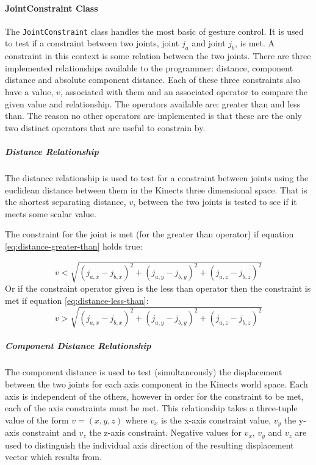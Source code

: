 \documentclass[a4paper,oneside]{memoir}
\begin{document}
				\paragraph{JointConstraint Class}

					The \texttt{JointConstraint} class handles the most basic of gesture control.
					It is used to test if a constraint between two joints, joint $j_a$ and joint $j_b$, is met.
					A constraint in this context is some relation between the two joints.
					There are three implemented relationships available to the programmer: distance, component distance and absolute component distance.
					Each of these three constraints also have a value, $v$, associated with them and an associated operator to compare the given value and relationship.
					The operators available are: greater than and less than.
					The reason no other operators are implemented is that these are the only two distinct operators that are useful to constrain by.

					\subparagraph{Distance Relationship}

						The distance relationship is used to test for a constraint between joints using the euclidean distance between them in the Kinects three dimensional space.
						That is the shortest separating distance, $v$, between the two joints is tested to see if it meets some scalar value.

						The constraint for the joint is met (for the greater than operator) if equation \ref{eq:distance-greater-than} holds true:

						\begin{equation}
							v < \sqrt{(j_{a,x} - j_{b,x})^2 + (j_{a,y} - j_{b,y})^2 + (j_{a,z} - j_{b,z})^2}
							\label{eq:distance-greater-than}
						\end{equation}
						Or if the constraint operator given is the less than operator then the constraint is met if equation \ref{eq:distance-less-than}:
						\begin{equation}
							v > \sqrt{(j_{a,x} - j_{b,x})^2 + (j_{a,y} - j_{b,y})^2 + (j_{a,z} - j_{b,z})^2}
							\label{eq:distance-less-than}
						\end{equation}

					\subparagraph{Component Distance Relationship}
						
						The component distance is used to test (simultaneously) the displacement between the two joints for each axis component in the Kinects world space.
						Each axis is independent of the others, however in order for the constraint to be met, each of the axis constraints must be met.
						This relationship takes a three-tuple value of the form $v = (x,y,z)$ where $v_x$ is the x-axis constraint value, $v_y$ the y-axis constraint and $v_z$ the z-axis constraint.
						Negative values for $v_x$, $v_y$ and $v_z$ are used to distinguish the individual axis direction of the resulting displacement vector which results from.
\end{document}
